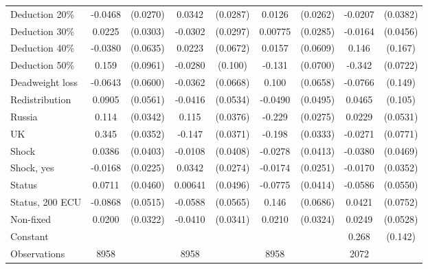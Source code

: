 \begin{tabular}{l|cccccc|cc}
Deduction 20\%&  -0.0468\sym{*}  & (0.0270)&   0.0342         & (0.0287)&   0.0126         & (0.0262)&  -0.0207         & (0.0382)\\
Deduction 30\%&   0.0225         & (0.0303)&  -0.0302         & (0.0297)&  0.00775         & (0.0285)&  -0.0164         & (0.0456)\\
Deduction 40\%&  -0.0380         & (0.0635)&   0.0223         & (0.0672)&   0.0157         & (0.0609)&    0.146         &  (0.167)\\
Deduction 50\%&    0.159\sym{*}  & (0.0961)&  -0.0280         &  (0.100)&   -0.131\sym{*}  & (0.0700)&   -0.342\sym{***}& (0.0722)\\
Deadweight loss&  -0.0643         & (0.0600)&  -0.0362         & (0.0668)&    0.100         & (0.0658)&  -0.0766         &  (0.149)\\
Redistribution&   0.0905         & (0.0561)&  -0.0416         & (0.0534)&  -0.0490         & (0.0495)&   0.0465         &  (0.105)\\
Russia        &    0.114\sym{***}& (0.0342)&    0.115\sym{***}& (0.0376)&   -0.229\sym{***}& (0.0275)&   0.0229         & (0.0531)\\
UK            &    0.345\sym{***}& (0.0352)&   -0.147\sym{***}& (0.0371)&   -0.198\sym{***}& (0.0333)&  -0.0271         & (0.0771)\\
Shock         &   0.0386         & (0.0403)&  -0.0108         & (0.0408)&  -0.0278         & (0.0413)&  -0.0380         & (0.0469)\\
Shock, yes    &  -0.0168         & (0.0225)&   0.0342         & (0.0274)&  -0.0174         & (0.0251)&  -0.0170         & (0.0352)\\
Status        &   0.0711         & (0.0460)&  0.00641         & (0.0496)&  -0.0775\sym{*}  & (0.0414)&  -0.0586         & (0.0550)\\
Status, 200 ECU&  -0.0868\sym{*}  & (0.0515)&  -0.0588         & (0.0565)&    0.146\sym{**} & (0.0686)&   0.0421         & (0.0752)\\
Non-fixed     &   0.0200         & (0.0322)&  -0.0410         & (0.0341)&   0.0210         & (0.0324)&   0.0249         & (0.0528)\\
Constant        &                  &         &                  &         &                  &         &    0.268\sym{*}  &  (0.142)\\
\hline
Observations    &     8958         &         &     8958         &         &     8958         &         &     2072         &         \\

\end{tabular}
